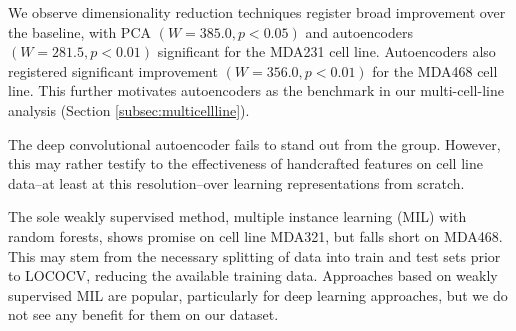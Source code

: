 
We observe dimensionality reduction techniques register broad improvement over the baseline, with PCA $(W=385.0, p < 0.05)$ and autoencoders $(W=281.5, p < 0.01)$ significant for the MDA231 cell line. Autoencoders also registered significant improvement $(W=356.0, p < 0.01)$ for the MDA468 cell line. This further motivates autoencoders as the benchmark in our multi-cell-line analysis (Section \ref{subsec:multicellline}).

The deep convolutional autoencoder fails to stand out from the group. However, this may rather testify to the effectiveness of handcrafted features on cell line data--at least at this resolution--over learning representations from scratch.

The sole weakly supervised method, multiple instance learning (MIL) with random forests, shows promise on cell line MDA321, but falls short on MDA468. This may stem from the necessary splitting of data into train and test sets prior to LOCOCV, reducing the available training data. Approaches based on weakly supervised MIL are popular, particularly for deep learning approaches, but we do not see any benefit for them on our dataset.

